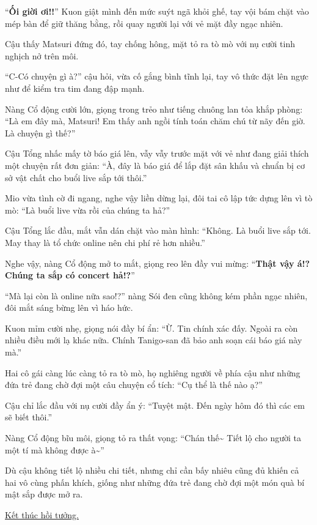 \documentclass[../main.tex]{subfiles}
\begin{document}
``\textbf{Ối giời ơi!!}'' Kuon giật mình đến mức suýt ngã khỏi ghế, tay vội bám chặt vào mép bàn để giữ thăng bằng, rồi quay người lại với vẻ mặt đầy ngạc nhiên.

Cậu thấy Matsuri đứng đó, tay chống hông, mặt tỏ ra tò mò với nụ cười tinh nghịch nở trên môi.

``C-Có chuyện gì à?'' cậu hỏi, vừa cố gắng bình tĩnh lại, tay vô thức đặt lên ngực như để kiểm tra tim đang đập mạnh.

Nàng Cổ động cười lớn, giọng trong trẻo như tiếng chuông lan tỏa khắp phòng: ``Là em đây mà, Matsuri! Em thấy anh ngồi tính toán chăm chú từ nãy đến giờ. Là chuyện gì thế?''

Cậu Tổng nhấc mấy tờ báo giá lên, vẫy vẫy trước mặt với vẻ như đang giải thích một chuyện rất đơn giản: ``À, đây là báo giá để lắp đặt sân khấu và chuẩn bị cơ sở vật chất cho buổi live sắp tới thôi.''

Mio vừa tình cờ đi ngang, nghe vậy liền dừng lại, đôi tai cô lập tức dựng lên vì tò mò: ``Là buổi live vừa rồi của chúng ta hả?''

Cậu Tổng lắc đầu, mắt vẫn dán chặt vào màn hình: ``Không. Là buổi live sắp tới. May thay là tổ chức online nên chi phí rẻ hơn nhiều.''

Nghe vậy, nàng Cổ động mở to mắt, giọng reo lên đầy vui mừng: ``\textbf{Thật vậy á!? Chúng ta sắp có concert hả!?}''

``Mà lại còn là online nữa sao!?'' nàng Sói đen cũng không kém phần ngạc nhiên, đôi mắt sáng bừng lên vì háo hức.

Kuon mỉm cười nhẹ, giọng nói đầy bí ẩn: ``Ừ. Tin chính xác đấy. Ngoài ra còn nhiều điều mới lạ khác nữa. Chính Tanigo-san đã bảo anh soạn cái báo giá này mà.''

Hai cô gái càng lúc càng tỏ ra tò mò, họ nghiêng người về phía cậu như những đứa trẻ đang chờ đợi một câu chuyện cổ tích: ``Cụ thể là thế nào ạ?''

Cậu chỉ lắc đầu với nụ cười đầy ẩn ý: ``Tuyệt mật. Đến ngày hôm đó thì các em sẽ biết thôi.''

Nàng Cổ động bĩu môi, giọng tỏ ra thất vọng: ``Chán thế\~{} Tiết lộ cho người ta một tí mà không được à\~{}''

Dù cậu không tiết lộ nhiều chi tiết, nhưng chỉ cần bấy nhiêu cũng đủ khiến cả hai vô cùng phấn khích, giống như những đứa trẻ đang chờ đợi một món quà bí mật sắp được mở ra.

\begin{center}
  \uline{Kết thúc hồi tưởng.}
\end{center}
\end{document}
